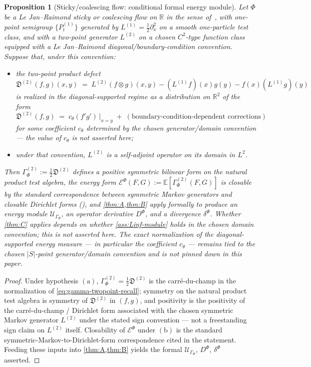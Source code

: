 \documentclass[11pt,reqno]{amsart}
\theoremstyle{plain}
\newtheorem{proposition}[theorem]{Proposition}
\theoremstyle{definition}
\theoremstyle{remark}
\newcommand{\R}{\mathbb{R}}
\newcommand{\E}{\mathbb{E}}
\newcommand{\cE}{\mathcal E}
\newcommand{\cU}{\mathcal U}
\begin{document}
\begin{proposition}[Sticky/coalescing flow: conditional formal energy module]\label{prop:sticky-formal}
Let $\Phi$ be a Le Jan--Raimond sticky or coalescing flow on
$\R$ in the sense of~\cite{LeJanRaimond2004}, with one-point
semigroup $\{P_{t}^{(1)}\}$ generated by
$L^{(1)}=\tfrac{1}{2}\partial_{x}^{2}$ on a smooth one-particle
test class, and with a two-point generator $L^{(2)}$ on a
chosen $C^{2}$-type function class equipped with a Le
Jan--Raimond diagonal/boundary-condition convention. Suppose
that, under this convention:
\begin{itemize}
\item[$(\mathrm a)$] the two-point product defect
\[
  \mathfrak D^{(2)}(f,g)(x,y)
  \;=\;L^{(2)}(f\otimes g)(x,y)-(L^{(1)}f)(x)g(y)-f(x)(L^{(1)}g)(y)
\]
is realized in the diagonal-supported regime as a distribution
on $\R^{2}$ of the form
\[
  \mathfrak D^{(2)}(f,g)\;=\;c_{\theta}(f'g')\,\big|_{x=y}
  \;+\;(\text{boundary-condition-dependent corrections})
\]
for some coefficient $c_{\theta}$ determined by the chosen
generator/domain convention --- the value of $c_{\theta}$ is
not asserted here;
\item[$(\mathrm b)$] under that convention, $L^{(2)}$ is a
self-adjoint operator on its domain in $L^{2}$.
\end{itemize}
Then $\Gamma^{(2)}_{\Phi}:=\tfrac{1}{2}\mathfrak D^{(2)}$
defines a positive symmetric bilinear form on the natural
product test algebra, the energy form
$\cE^{\Phi}(F,G):=\E[\Gamma^{(2)}_{\Phi}(F,G)]$ is closable by
the standard correspondence between symmetric Markov generators
and closable Dirichlet forms (\cite[Ch.~1]{FukushimaOshimaTakeda}),
and \cref{thm:A,thm:B} apply formally to produce an energy
module $\cU_{\Gamma_{\Phi}}$, an operator derivative $D^{\Phi}$,
and a divergence $\delta^{\Phi}$. Whether \cref{thm:C} applies
depends on whether \cref{ass:Linf-module} holds in the chosen
domain convention; this is not asserted here. The exact
normalization of the diagonal-supported energy measure ---
in particular the coefficient $c_{\theta}$ --- remains tied to
the chosen $|S|$-point generator/domain convention and is not
pinned down in this paper.
\end{proposition}

\begin{proof}
Under hypothesis $(\mathrm a)$,
$\Gamma^{(2)}_{\Phi}=\tfrac{1}{2}\mathfrak D^{(2)}$ is the
carr\'e-du-champ in the normalization of
\eqref{eq:gamma-twopoint-recall}; symmetry on the natural
product test algebra is symmetry of $\mathfrak D^{(2)}$ in
$(f,g)$, and positivity is the positivity of the
carr\'e-du-champ / Dirichlet form associated with the chosen
symmetric Markov generator $L^{(2)}$ under the stated sign
convention --- not a freestanding sign claim on $L^{(2)}$ itself.
Closability of $\cE^{\Phi}$ under $(\mathrm b)$ is the standard
symmetric-Markov-to-Dirichlet-form correspondence cited in the
statement. Feeding these inputs into \cref{thm:A,thm:B} yields
the formal $\cU_{\Gamma_{\Phi}}$, $D^{\Phi}$, $\delta^{\Phi}$
asserted.
\end{proof}
\end{document}
